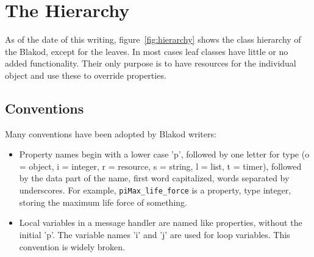 \documentclass[12pt]{article}
\newcommand{\prop}[1]{\texttt{#1}}
\begin{document}
\section{The Hierarchy}

As of the date of this writing, figure~\ref{fig:hierarchy} shows the
class hierarchy of the Blakod, except for the leaves.  In most
cases leaf classes have little or no added functionality.  Their only
purpose is to have resources for the individual object and use these
to override properties.

\subsection{Conventions}

Many conventions have been adopted by Blakod writers:

\begin{itemize}
\item Property names begin with a lower case 'p', followed by one
letter for type (o = object, i = integer, r = resource, s = string, l
= list, t = timer), followed by the data part of the name, first word
capitalized, words separated by underscores.  For example,
\prop{piMax\_life\_force} is a property, type integer, storing the
maximum life force of something.
\item Local variables in a message handler are named like properties,
without the initial 'p'.  The variable names 'i' and 'j' are used for
loop variables.  This convention is widely broken.
\end{itemize}
\end{document}
